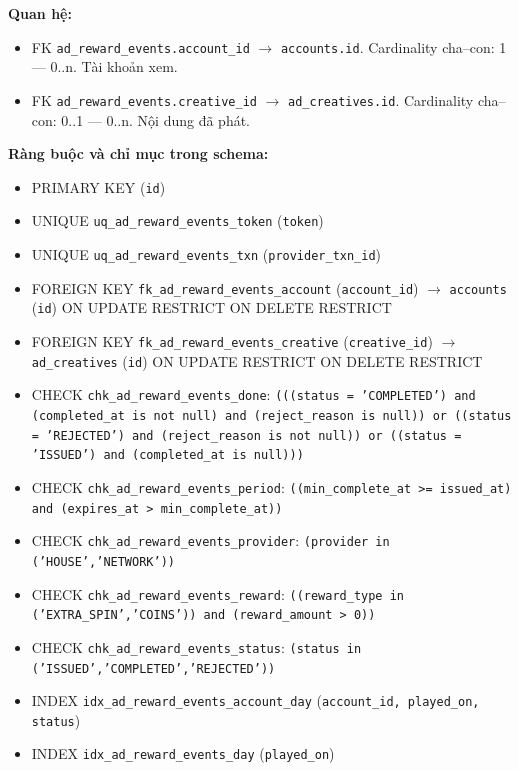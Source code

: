 \textbf{Quan hệ:}

\begin{itemize}

\item FK \texttt{ad\_reward\_events.account\_id} $\rightarrow$ \texttt{accounts.id}. Cardinality cha--con: 1 — 0..n. Tài khoản xem.

\item FK \texttt{ad\_reward\_events.creative\_id} $\rightarrow$ \texttt{ad\_creatives.id}. Cardinality cha--con: 0..1 — 0..n. Nội dung đã phát.

\end{itemize}

\textbf{Ràng buộc và chỉ mục trong schema:}

\begin{itemize}

\item PRIMARY KEY (\texttt{id})

\item UNIQUE \texttt{uq\_ad\_reward\_events\_token} (\texttt{token})

\item UNIQUE \texttt{uq\_ad\_reward\_events\_txn} (\texttt{provider\_txn\_id})

\item FOREIGN KEY \texttt{fk\_ad\_reward\_events\_account} (\texttt{account\_id}) $\rightarrow$ \texttt{accounts} (\texttt{id}) ON UPDATE RESTRICT ON DELETE RESTRICT

\item FOREIGN KEY \texttt{fk\_ad\_reward\_events\_creative} (\texttt{creative\_id}) $\rightarrow$ \texttt{ad\_creatives} (\texttt{id}) ON UPDATE RESTRICT ON DELETE RESTRICT

\item CHECK \texttt{chk\_ad\_reward\_events\_done}: \texttt{(((status = 'COMPLETED') and (completed\_at is not null) and (reject\_reason is null)) or ((status = 'REJECTED') and (reject\_reason is not null)) or ((status = 'ISSUED') and (completed\_at is null)))}

\item CHECK \texttt{chk\_ad\_reward\_events\_period}: \texttt{((min\_complete\_at >= issued\_at) and (expires\_at > min\_complete\_at))}

\item CHECK \texttt{chk\_ad\_reward\_events\_provider}: \texttt{(provider in ('HOUSE','NETWORK'))}

\item CHECK \texttt{chk\_ad\_reward\_events\_reward}: \texttt{((reward\_type in ('EXTRA\_SPIN','COINS')) and (reward\_amount > 0))}

\item CHECK \texttt{chk\_ad\_reward\_events\_status}: \texttt{(status in ('ISSUED','COMPLETED','REJECTED'))}

\item INDEX \texttt{idx\_ad\_reward\_events\_account\_day} (\texttt{account\_id, played\_on, status})

\item INDEX \texttt{idx\_ad\_reward\_events\_day} (\texttt{played\_on})

\end{itemize}

